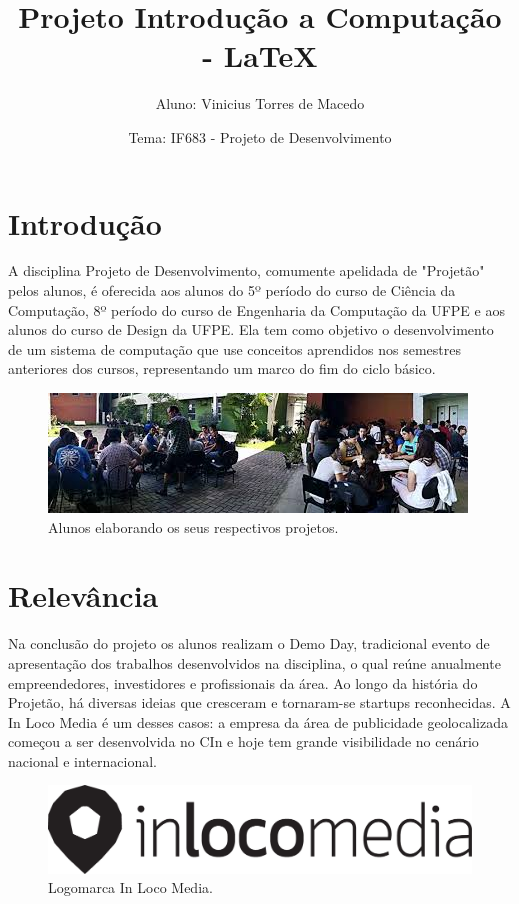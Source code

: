\documentclass{article}
\title{Projeto Introdução a Computação - LaTeX}
\author{Aluno: Vinicius Torres de Macedo}
\date{Tema: IF683 - Projeto de Desenvolvimento}
\begin{document}
\maketitle

\section{Introdução}
 A disciplina Projeto de Desenvolvimento, comumente apelidada de "Projetão" pelos alunos, é oferecida aos alunos do 5º período do curso de Ciência da Computação, 8º período do curso de Engenharia da Computação da UFPE e aos alunos do curso de Design da UFPE. Ela tem como objetivo o desenvolvimento de um sistema de computação que use conceitos aprendidos nos semestres anteriores dos cursos, representando um marco do fim do ciclo básico. \cite{Site1}

\begin{figure}[h!]
\centering
\includegraphics[scale=0.82]{alunosnopatio}
\caption{Alunos elaborando os seus respectivos projetos.}
\label{fig:alunosnopatio}
\end{figure}

\section{Relevância}
Na conclusão do projeto os alunos realizam o Demo Day, tradicional evento de apresentação dos trabalhos desenvolvidos na disciplina, o qual reúne anualmente empreendedores, investidores e profissionais da área. Ao longo da história do Projetão, há diversas ideias que cresceram e tornaram-se startups reconhecidas. A In Loco Media é um desses casos: a empresa da área de publicidade geolocalizada começou a ser desenvolvida no CIn e hoje tem grande visibilidade no cenário nacional e internacional. \cite{Site2}

\begin{figure}[h!]
\centering
\includegraphics[scale=0.82]{inloco}
\caption{Logomarca In Loco Media.}
\label{fig:inloco}
\end{figure}
\end{document}
